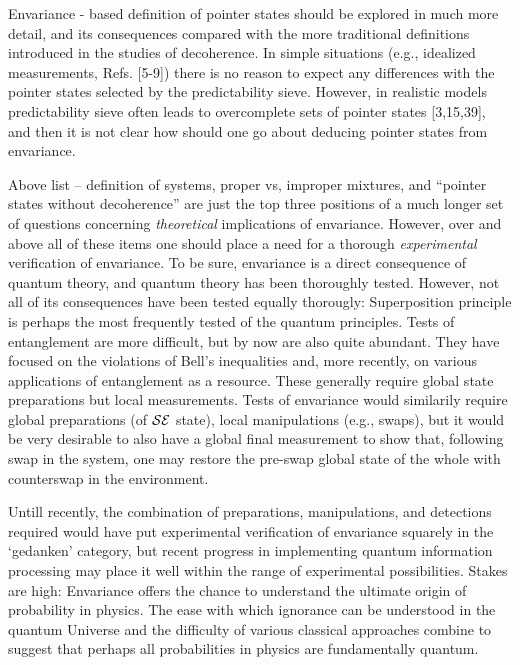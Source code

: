 \documentclass[aps,pra,epsfig,11pt,floatfix]{revtex4}
\begin{document}

Envariance - based
definition of pointer states should be explored in much more detail, and its
consequences compared with the more traditional definitions introduced in the
studies of decoherence. In simple situations (e.g., idealized measurements,
Refs. [5-9]) there is no reason to expect any differences with the pointer
states selected by the predictability sieve. However, in realistic models
predictability sieve often leads to overcomplete sets of pointer states [3,15,39], 
and then it is not clear how should one go about
deducing pointer states from envariance.

Above list -- definition of systems, proper vs, improper mixtures, 
and ``pointer
states without decoherence'' are just the top three positions of a much longer
set of questions concerning {\it theoretical} implications of envariance.
However, over and above all of these items one should place a need for
a thorough {\it experimental} verification of envariance. To be sure,
envariance is a direct consequence of quantum theory, and quantum theory 
has been thoroughly tested. However, not all of
its consequences have been tested equally thorougly: Superposition principle
is perhaps the most frequently tested of the quantum principles. Tests of
entanglement are more difficult, but by now are also quite abundant. They have
focused on the violations of Bell's inequalities and, more recently, on various
applications of entanglement as a resource. These generally require 
global state
preparations but local measurements. Tests of envariance would similarily
require global preparations (of ${\cal SE}$ state), local manipulations
(e.g., swaps), but it would be very desirable to also have a global final
measurement to show that, following swap in the system, one may restore the
pre-swap global state of the whole with counterswap in the environment.

Untill recently, the combination of preparations, manipulations, and detections
required would have put experimental verification of envariance squarely in the
`gedanken' category, but recent progress in implementing quantum information
processing may place it well within the range of experimental possibilities.
Stakes are high: Envariance offers the chance to understand the ultimate origin
of probability in physics. The ease with which ignorance can be understood
in the quantum Universe and the difficulty of various classical approaches
combine to suggest that perhaps all probabilities in physics are fundamentally
quantum.
\end{document}
